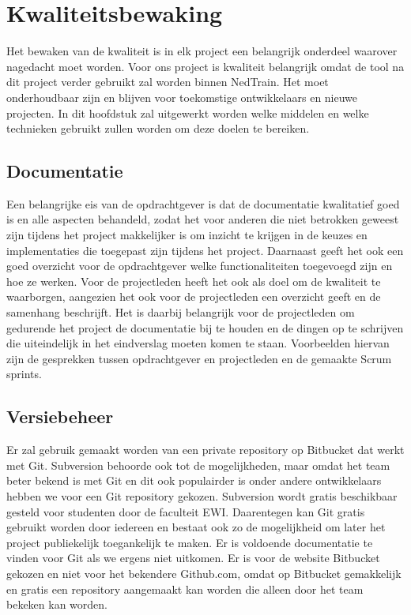 \section{Kwaliteitsbewaking}
Het bewaken van de kwaliteit is in elk project een belangrijk onderdeel waarover nagedacht moet worden. Voor ons project is kwaliteit belangrijk omdat de tool na dit project verder gebruikt zal worden binnen NedTrain. Het moet onderhoudbaar zijn en blijven voor toekomstige ontwikkelaars en nieuwe projecten. In dit hoofdstuk zal uitgewerkt worden welke middelen en welke technieken gebruikt zullen worden om deze doelen te bereiken.

\subsection{Documentatie}
Een belangrijke eis van de opdrachtgever is dat de documentatie kwalitatief goed is en alle aspecten behandeld, zodat het voor anderen die niet betrokken geweest zijn tijdens het project makkelijker is om inzicht te krijgen in de keuzes en implementaties die toegepast zijn tijdens het project. Daarnaast geeft het ook een goed overzicht voor de opdrachtgever welke functionaliteiten toegevoegd zijn en hoe ze werken. Voor de projectleden heeft het ook als doel om de kwaliteit te waarborgen, aangezien het ook voor de projectleden een overzicht geeft en de samenhang beschrijft. Het is daarbij belangrijk voor de projectleden om gedurende het project de documentatie bij te houden en de dingen op te schrijven die uiteindelijk in het eindverslag moeten komen te staan. Voorbeelden hiervan zijn de gesprekken tussen opdrachtgever en projectleden en de gemaakte Scrum sprints.

\subsection{Versiebeheer}
Er zal gebruik gemaakt worden van een private repository op Bitbucket dat werkt met Git. Subversion behoorde ook tot de mogelijkheden, maar omdat het team beter bekend is met Git en dit ook populairder is onder andere ontwikkelaars hebben we voor een Git repository gekozen. Subversion wordt gratis beschikbaar gesteld voor studenten door de faculteit EWI. Daarentegen kan Git gratis gebruikt worden door iedereen en bestaat ook zo de mogelijkheid om later het project publiekelijk toegankelijk te maken. Er is voldoende documentatie te vinden voor Git als we ergens niet uitkomen. Er is voor de website Bitbucket gekozen en niet voor het bekendere Github.com, omdat op Bitbucket gemakkelijk en gratis een repository aangemaakt kan worden die alleen door het team bekeken kan worden. 

